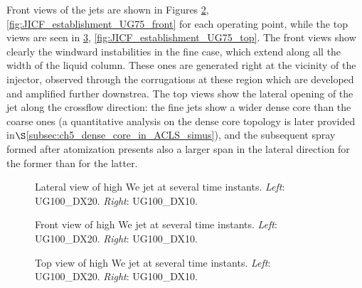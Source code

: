 Front views of the jets are shown in Figures \ref{fig:JICF_establishment_UG100_front}, \ref{fig:JICF_establishment_UG75_front} for each operating point, while the top views are seen in \ref{fig:JICF_establishment_UG100_top}, \ref{fig:JICF_establishment_UG75_top}. The front views show clearly the windward instabilities in the fine case, which extend along all the width of the liquid column. These ones are generated right at the vicinity of the injector, observed through the corrugations at these region which are developed and amplified further downstrea. The top views show the lateral opening of the jet along the crossflow direction: the fine jets show a wider dense core than the coarse ones (a quantitative analysis on the dense core topology is later provided in$\S$\ref{subsec:ch5_dense_core_in_ACLS_simus}), and the subsequent spray formed after atomization presents also a larger span in the lateral direction for the former than for the latter.



\clearpage

\begin{figure}[ht]
\centering
{}
\caption[Lateral view of high We jet at several time instants. ]{Lateral view of high We jet at several time instants. \textsl{Left}: UG100\_DX20. \textsl{Right}: UG100\_DX10.}
\label{fig:JICF_establishment_UG100_lateral}
\end{figure}

\clearpage

\begin{figure}[ht]
\centering
{}
\caption[Front view of high We jet at several time instants. ]{Front view of high We jet at several time instants. \textsl{Left}: UG100\_DX20. \textsl{Right}: UG100\_DX10.}
\label{fig:JICF_establishment_UG100_front}
\end{figure}


\clearpage

\begin{figure}[ht]
\centering
{}
\caption[Top view of high We jet at several time instants. ]{Top view of high We jet at several time instants. \textsl{Left}: UG100\_DX20. \textsl{Right}: UG100\_DX10.}
\label{fig:JICF_establishment_UG100_top}
\end{figure}




